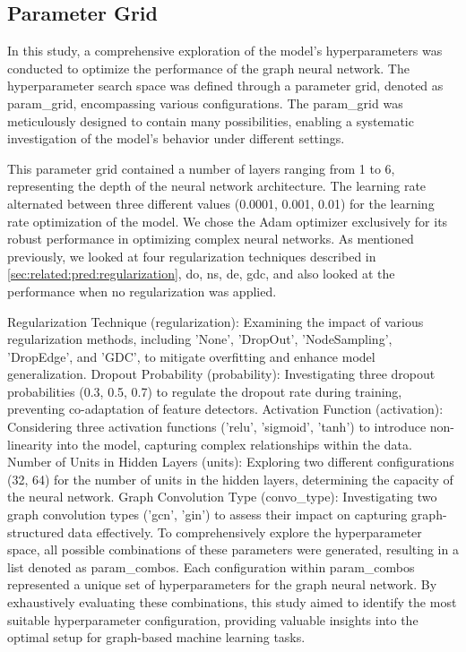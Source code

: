 \subsection{Parameter Grid}
In this study, a comprehensive exploration of the model's hyperparameters was conducted to optimize the performance of the graph neural network. The hyperparameter search space was defined through a parameter grid, denoted as param_grid, encompassing various configurations. The param_grid was meticulously designed to contain many possibilities, enabling a systematic investigation of the model's behavior under different settings.

This parameter grid contained a number of layers ranging from 1 to 6, representing the depth of the neural network architecture.
The learning rate alternated between three different values (0.0001, 0.001, 0.01) for the learning rate optimization of the model.
We chose the Adam optimizer exclusively for its robust performance in optimizing complex neural networks.
As mentioned previously, we looked at four regularization techniques described in \cref{sec:related:pred:regularization}, \ac{do}, \ac{ns}, \ac{de}, \ac{gdc}, and also looked at the performance when no regularization was applied.


Regularization Technique (regularization): Examining the impact of various regularization methods, including 'None', 'DropOut', 'NodeSampling', 'DropEdge', and 'GDC', to mitigate overfitting and enhance model generalization.
Dropout Probability (probability): Investigating three dropout probabilities (0.3, 0.5, 0.7) to regulate the dropout rate during training, preventing co-adaptation of feature detectors.
Activation Function (activation): Considering three activation functions ('relu', 'sigmoid', 'tanh') to introduce non-linearity into the model, capturing complex relationships within the data.
Number of Units in Hidden Layers (units): Exploring two different configurations (32, 64) for the number of units in the hidden layers, determining the capacity of the neural network.
Graph Convolution Type (convo_type): Investigating two graph convolution types ('gcn', 'gin') to assess their impact on capturing graph-structured data effectively.
To comprehensively explore the hyperparameter space, all possible combinations of these parameters were generated, resulting in a list denoted as param_combos. Each configuration within param_combos represented a unique set of hyperparameters for the graph neural network. By exhaustively evaluating these combinations, this study aimed to identify the most suitable hyperparameter configuration, providing valuable insights into the optimal setup for graph-based machine learning tasks.

